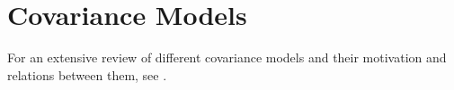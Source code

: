 \section{Covariance Models}

For an extensive review of different covariance models and their motivation and
relations between them, see \textcite[chapter
4]{williamsGaussianProcessesMachine2006}.





